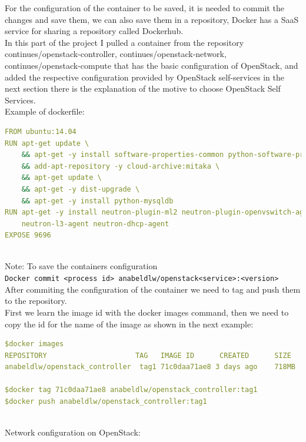 For the configuration of the container to be saved, it is needed to commit the changes and save them, we can also save them in a repository, Docker has a SaaS service for sharing a repository called Dockerhub.\cite{4}\\

In this part of the project I pulled a container from the repository continues/openstack-controller, continues/openstack-network, continues/openstack-compute that has the basic configuration of OpenStack, and added the respective configuration provided by OpenStack self-services in the next section there is the explanation of the motive to choose OpenStack Self Services.\\

Example of dockerfile:\\
\begin{lstlisting}[language=yaml,frame=tb,caption={Dockerfile}]
FROM ubuntu:14.04
RUN apt-get update \
	&& apt-get -y install software-properties-common python-software-properties \
	&& add-apt-repository -y cloud-archive:mitaka \
	&& apt-get update \
	&& apt-get -y dist-upgrade \
	&& apt-get -y install python-mysqldb 
RUN apt-get -y install neutron-plugin-ml2 neutron-plugin-openvswitch-agent \
    neutron-l3-agent neutron-dhcp-agent
EXPOSE 9696
\end{lstlisting}\\

Note: To save the containers configuration\\
\texttt{Docker commit <process id> anabeldlw/openstack<service>:<version>}\\

After commiting the configuration of the container we need to tag and push them to the repository.\\

First we learn the image id with the docker images command, then we need to copy the id for the name of the image as shown in the next example:\\
\begin{lstlisting}[language=yaml,frame=tb,caption={Dockerfile}]
$docker images
REPOSITORY				       TAG	 IMAGE ID	   CREATED 	    SIZE
anabeldlw/openstack_controller	tag1 71c0daa71ae8 3 days ago 	718MB

$docker tag 71c0daa71ae8 anabeldlw/openstack_controller:tag1
$docker push anabeldlw/openstack_controller:tag1
\end{lstlisting}\\

Network configuration on OpenStack:

